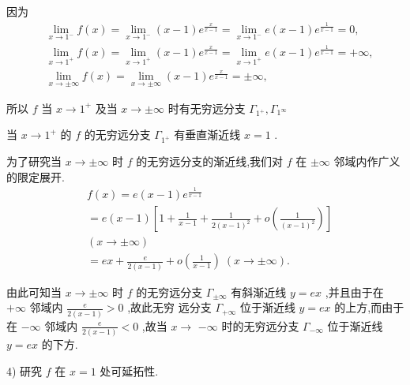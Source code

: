 因为
\begin{align*}
	&\mathop{\lim }\limits_{{x \rightarrow  {1}^{ - }}}f\left( x\right)  = \mathop{\lim }\limits_{{x \rightarrow  {1}^{ - }}}\left( {x - 1}\right) {e}^{\frac{x}{x - 1}} = \mathop{\lim }\limits_{{x \rightarrow  {1}^{ - }}}e\left( {x - 1}\right) {e}^{\frac{1}{x - 1}} = 0,\\
	&\mathop{\lim }\limits_{{x \rightarrow  {1}^{ + }}}f\left( x\right)  = \mathop{\lim }\limits_{{x \rightarrow  {1}^{ + }}}\left( {x - 1}\right) {e}^{\frac{x}{x - 1}} = \mathop{\lim }\limits_{{x \rightarrow  {1}^{ + }}}e\left( {x - 1}\right) {e}^{\frac{1}{x - 1}} =  + \infty ,\\
	&\mathop{\lim }\limits_{{x \rightarrow   \pm  \infty }}f\left( x\right)  = \mathop{\lim }\limits_{{x \rightarrow   \pm  \infty }}\left( {x - 1}\right) {e}^{\frac{x}{x - 1}} =  \pm  \infty ,
\end{align*}

所以 $f$ 当 $x \rightarrow  {1}^{ + }$ 及当 $x \rightarrow   \pm  \infty$ 时有无穷远分支 ${\Gamma }_{{1}^{ + }},{\Gamma }_{{1}^{\infty }}$

当 $x \rightarrow  {1}^{ + }$ 的 $f$ 的无穷远分支 ${\Gamma }_{{1}^{ + }}$ 有垂直渐近线 $x = 1$ .

为了研究当 $x \rightarrow   \pm  \infty$ 时 $f$ 的无穷远分支的渐近线,我们对 $f$ 在 $\pm  \infty$ 邻域内作广义的限定展开.
\begin{align*}
	&f\left( x\right)  = e\left( {x - 1}\right) {e}^{\frac{1}{x - 1}}\\
	&= e\left( {x - 1}\right) \left\lbrack  {1 + \frac{1}{x - 1} + \frac{1}{2{\left( x - 1\right) }^{2}} + o\left( \frac{1}{{\left( x - 1\right) }^{2}}\right) }\right\rbrack\\
	&\left( {x \rightarrow   \pm  \infty }\right)\\
	&= {ex} + \frac{e}{2\left( {x - 1}\right) } + o\left( \frac{1}{x - 1}\right) \;\left( {x \rightarrow   \pm  \infty }\right) .
\end{align*}

由此可知当 $x \rightarrow   \pm  \infty$ 时 $f$ 的无穷远分支 ${\Gamma }_{\pm \infty }$ 有斜渐近线 $y = {ex}$ ,并且由于在 $+ \infty$ 邻域内 $\frac{e}{2\left( {x - 1}\right) } > 0$ ,故此无穷 远分支 ${\Gamma }_{+\infty }$ 位于渐近线 $y = {ex}$ 的上方,而由于在 $- \infty$ 邻域内 $\frac{e}{2\left( {x - 1}\right) } < 0$ ,故当 $x \rightarrow$  $- \infty$ 时的无穷远分支 ${\Gamma }_{-\infty }$ 位于渐近线 $y = {ex}$ 的下方.

4) 研究 $f$ 在 $x = 1$ 处可延拓性.

